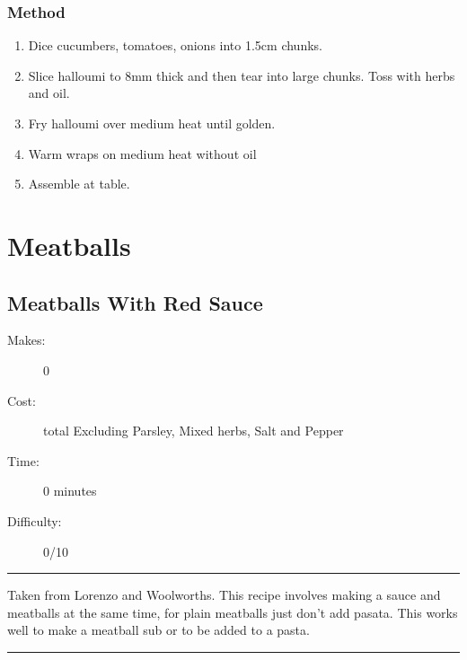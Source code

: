 \documentclass[]{article}
\begin{document}
\subsubsection*{\Large Method}
\begin{enumerate}[font=\huge\color{accent}]
	\item Dice cucumbers, tomatoes, onions into 1.5cm chunks.
	\item Slice halloumi to 8mm thick and then tear into large chunks. Toss with herbs and oil.
	\item Fry halloumi over medium heat until golden.
	\item Warm wraps on medium heat without oil
	\item Assemble at table.
\end{enumerate}
\newpage
{}
\section*{\center\Huge\color{accent}Meatballs}
\label{cat:Meatballs}
\label{rec:Meatballs With Red Sauce}
\subsection*{\center\huge Meatballs With Red Sauce}
\begin{description}
\item[Makes:] 0 
\item[Cost:]  total Excluding Parsley, Mixed herbs, Salt and Pepper
\item[Time:] 0 minutes
\item[Difficulty:] 0/10
\end{description}
\vspace{0.2cm}\hrule\vspace{0.5cm}
\begin{adjustwidth}{0.5 cm}{0.5 cm}

Taken from Lorenzo and Woolworths. This recipe involves making a sauce and meatballs at the same time, for plain meatballs just don't add pasata. This works well to make a meatball sub or to be added to a pasta. 

\end{adjustwidth}
\vspace{0.5cm}\hrule
\end{document}
